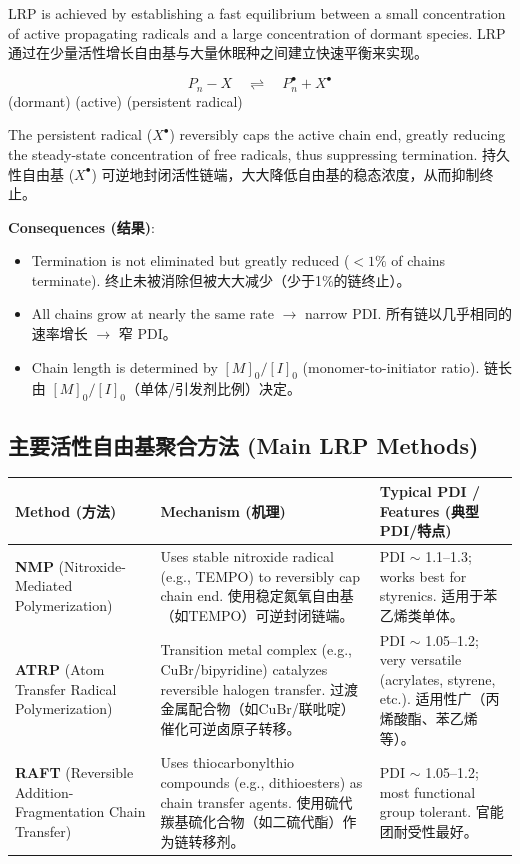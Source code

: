 \documentclass[12pt,a4paper]{ctexart}
\begin{document}
LRP is achieved by establishing a fast equilibrium between a small concentration of active propagating radicals and a large concentration of dormant species.  
LRP 通过在少量活性增长自由基与大量休眠种之间建立快速平衡来实现。

\[
P_n-X \quad \rightleftharpoons \quad P_n^\bullet + X^\bullet
\]
(dormant) \hspace{2cm} (active) \hspace{2cm} (persistent radical)

The persistent radical ($X^\bullet$) reversibly caps the active chain end, greatly reducing the steady-state concentration of free radicals, thus suppressing termination.  
持久性自由基 ($X^\bullet$) 可逆地封闭活性链端，大大降低自由基的稳态浓度，从而抑制终止。

\textbf{Consequences (结果)}:
\begin{itemize}
    \item Termination is not eliminated but greatly reduced ($<1\%$ of chains terminate).  
      终止未被消除但被大大减少（少于1\%的链终止）。
    \item All chains grow at nearly the same rate $\rightarrow$ narrow PDI.  
      所有链以几乎相同的速率增长 $\rightarrow$ 窄 PDI。
    \item Chain length is determined by $[M]_0/[I]_0$ (monomer-to-initiator ratio).  
      链长由 $[M]_0/[I]_0$（单体/引发剂比例）决定。
\end{itemize}

\subsection{主要活性自由基聚合方法 (Main LRP Methods)}

\begin{longtable}{p{3.5cm}p{5cm}p{5cm}}
\toprule
\textbf{Method (方法)} & \textbf{Mechanism (机理)} & \textbf{Typical PDI / Features (典型PDI/特点)} \\
\midrule
\textbf{NMP} (Nitroxide-Mediated Polymerization) & Uses stable nitroxide radical (e.g., TEMPO) to reversibly cap chain end.  
使用稳定氮氧自由基（如TEMPO）可逆封闭链端。 & PDI $\sim$ 1.1–1.3; works best for styrenics.  
适用于苯乙烯类单体。 \\
\textbf{ATRP} (Atom Transfer Radical Polymerization) & Transition metal complex (e.g., CuBr/bipyridine) catalyzes reversible halogen transfer.  
过渡金属配合物（如CuBr/联吡啶）催化可逆卤原子转移。 & PDI $\sim$ 1.05–1.2; very versatile (acrylates, styrene, etc.).  
适用性广（丙烯酸酯、苯乙烯等）。 \\
\textbf{RAFT} (Reversible Addition-Fragmentation Chain Transfer) & Uses thiocarbonylthio compounds (e.g., dithioesters) as chain transfer agents.  
使用硫代羰基硫化合物（如二硫代酯）作为链转移剂。 & PDI $\sim$ 1.05–1.2; most functional group tolerant.  
官能团耐受性最好。 \\
\bottomrule
\end{longtable}
\end{document}
